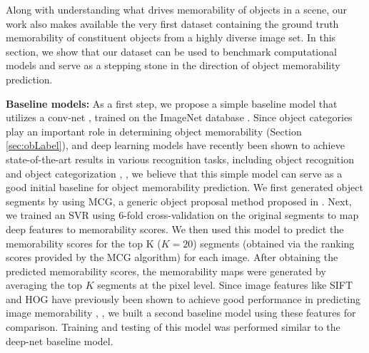 Along with understanding what drives memorability of objects in a scene, our work also makes available the very first dataset containing the ground truth memorability of constituent objects from a highly diverse image set. In this section, we show that our dataset can be used to benchmark computational models and serve as a stepping stone in the direction of object memorability prediction.

\noindent
\textbf{Baseline models:} As a first step, we propose a simple
baseline model that utilizes a conv-net \cite{krizhevsky12},
\cite{jia14} trained on the ImageNet database \cite{deng09}. Since
object categories play an important role in determining object
memorability (Section \ref{sec:obLabel}), and deep learning models have
recently been shown to achieve state-of-the-art results in various
recognition tasks, including object recognition and object
categorization \cite{cnn14}, \cite{lee2009convolutional}, we believe
that this simple model can serve as a good initial baseline for object
memorability prediction. We first generated object segments by using
MCG, a generic object proposal method proposed in
\cite{arbelaez14}. Next, we trained an SVR using $6$-fold
cross-validation on the original segments to map deep features to
memorability scores. We then used this model to predict the
memorability scores for the top K ($K=20$) segments (obtained via the
ranking scores provided by the MCG algorithm) for each image. After
obtaining the predicted memorability scores, the memorability maps
were generated by averaging the top $K$ segments at the pixel
level. 
Since image features like SIFT \cite{lowe04} and HOG
\cite{dalal05} have previously been shown to achieve good performance
in predicting image memorability \cite{isola11}, \cite{isola14}, we
built a second baseline model using these features for
comparison. Training and testing of this model was performed similar
to the deep-net baseline model. 

